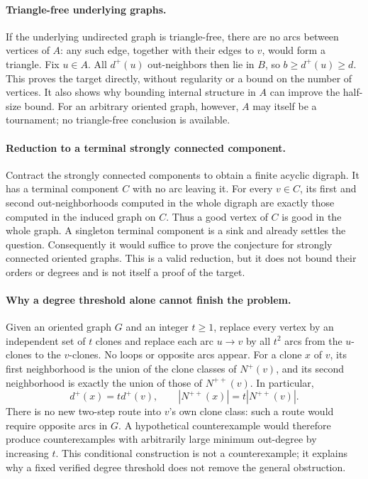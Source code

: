 \documentclass[11pt,a4paper]{article}
\begin{document}
\paragraph{Triangle-free underlying graphs.}
If the underlying undirected graph is triangle-free, there are no arcs
between vertices of $A$: any such edge, together with their edges to
$v$, would form a triangle. Fix $u\in A$. All $d^+(u)$ out-neighbors
then lie in $B$, so $b\geq d^+(u)\geq d$. This proves the target directly,
without regularity or a bound on the number of vertices. It also shows
why bounding internal structure in $A$ can improve the half-size bound.
For an arbitrary oriented graph, however, $A$ may itself be a tournament;
no triangle-free conclusion is available.

\paragraph{Reduction to a terminal strongly connected component.}
Contract the strongly connected components to obtain a finite acyclic
digraph. It has a terminal component $C$ with no arc leaving it. For
every $v\in C$, its first and second out-neighborhoods computed in the
whole digraph are exactly those computed in the induced graph on $C$.
Thus a good vertex of $C$ is good in the whole graph. A singleton
terminal component is a sink and already settles the question.
Consequently it would suffice to prove the conjecture for strongly
connected oriented graphs. This is a valid reduction, but it does not
bound their orders or degrees and is not itself a proof of the target.

\paragraph{Why a degree threshold alone cannot finish the problem.}
Given an oriented graph $G$ and an integer $t\geq1$, replace every vertex
by an independent set of $t$ clones and replace each arc $u\to v$ by
all $t^2$ arcs from the $u$-clones to the $v$-clones. No loops or opposite
arcs appear. For a clone $x$ of $v$, its first neighborhood is the union
of the clone classes of $N^+(v)$, and its second neighborhood is exactly
the union of those of $N^{++}(v)$. In particular,
\[
 d^+(x)=t d^+(v),\qquad |N^{++}(x)|=t|N^{++}(v)|.
\]
There is no new two-step route into $v$'s own clone class: such a route
would require opposite arcs in $G$. A hypothetical counterexample
would therefore produce counterexamples with arbitrarily large minimum
out-degree by increasing $t$. This conditional construction is not a
counterexample; it explains why a fixed verified degree threshold does
not remove the general obstruction.
\end{document}
